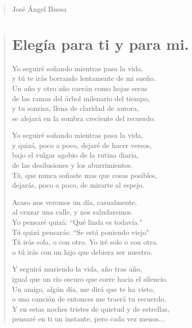 \documentclass[11pt, portrait, twoside, notitlepage, openright]{book}
\begin{document}
\begin{verse}
José Ángel Buesa
\end{verse}

\newpage
\begin{verse}
\begin{center}
\section{Elegía para ti y para mi.}
\end{center}
Yo seguiré soñando mientras pasa la vida,\\
y tú te irás borrando lentamente de mi sueño.\\
Un año y otro año caerán como hojas secas\\
de las ramas del árbol milenario del tiempo,\\
y tu sonrisa, llena de claridad de aurora,\\
se alejará en la sombra creciente del recuerdo.
\newline

Yo seguiré soñando mientras pasa la vida,\\
y quizá, poco a poco, dejaré de hacer versos,\\
bajo el vulgar agobio de la rutina diaria,\\
de las desilusiones y los aburrimientos.\\
Tú, que nunca soñaste mas que cosas posibles,\\
dejarás, poco a poco, de mirarte al espejo.
\newline

Acaso nos veremos un día, casualmente,\\
al cruzar una calle, y nos saludaremos.\\
Yo pensaré quizá: ``Qué linda es todavía."\\
Tú quizá pensarás: ``Se está poniendo viejo"\\
Tú irás sola, o con otro. Yo iré solo o con otra.\\
o tú irás con un hijo que debiera ser nuestro.
\newpage

Y seguirá muriendo la vida, año tras año,\\
igual que un río oscuro que corre hacia el silencio.\\
Un amigo, algún día, me dirá que te ha visto,\\
o una canción de entonces me traerá tu recuerdo.\\
Y en estas noches tristes de quietud y de estrellas,\\
pensaré en ti un instante, pero cada vez menos...
\newline


\end{verse}
\end{document}
